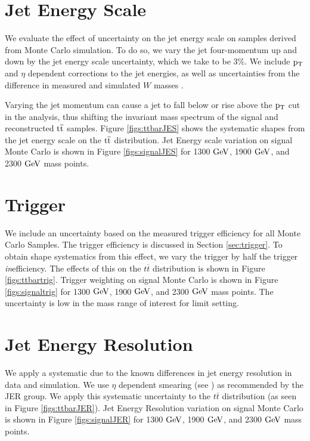 \section{Jet Energy Scale}
We evaluate the effect of uncertainty on the jet energy scale on samples derived from Monte Carlo simulation.  
To do so, we vary the jet four-momentum up and down by the jet energy 
scale uncertainty, which we take to be $3\%$. We include $\mathrm{p_{T}}$ and $\eta$ dependent corrections to the 
jet energies, as well as uncertainties from the difference in measured and simulated $W$ masses \cite{ZP8TeV}. 

Varying the jet momentum can cause a jet to fall below or rise above the $\mathrm{p_{T}}$ cut in the analysis, thus shifting the invariant 
mass spectrum of the signal and reconstructed $\mathrm{t\overline{t}}$ samples. Figure \ref{figs:ttbarJES} shows the systematic shapes from the 
jet energy scale on the $\mathrm{t\overline{t}}$ distribution.  Jet Energy scale variation on signal Monte Carlo is shown in Figure \ref{figs:signalJES} for 1300$~\mathrm{GeV}$,
 1900$~\mathrm{GeV}$, and 2300$~\mathrm{GeV}$ mass points.

\section{Trigger}
We include an uncertainty based on the measured trigger efficiency for all Monte Carlo Samples. The trigger efficiency is discussed in Section \ref{sec:trigger}. 
To obtain shape systematics from this effect, we vary the trigger by half the trigger \textit{in}efficiency. The effects of this on the $t\overline{t}$ 
distribution is shown in Figure \ref{figs:ttbartrig}. Trigger weighting on signal Monte Carlo is shown in Figure \ref{figs:signaltrig} for 1300$~\mathrm{GeV}$,
 1900$~\mathrm{GeV}$, and 2300$~\mathrm{GeV}$ mass points.  The uncertainty is low in the mass range of interest for limit setting.

\section{Jet Energy Resolution}
\label{sec:JER}
We apply a systematic due to the known differences in jet energy resolution in data and simulation.  We use $\eta$ dependent smearing (see \cite{ZP8TeV}) as recommended by the JER group.  
We apply this systematic uncertainty to the $t\overline{t}$ distribution 
(as seen in Figure \ref{figs:ttbarJER}).  Jet Energy Resolution variation on signal Monte Carlo is shown in Figure \ref{figs:signalJER} for 1300$~\mathrm{GeV}$,
 1900$~\mathrm{GeV}$, and 2300$~\mathrm{GeV}$ mass points. 

